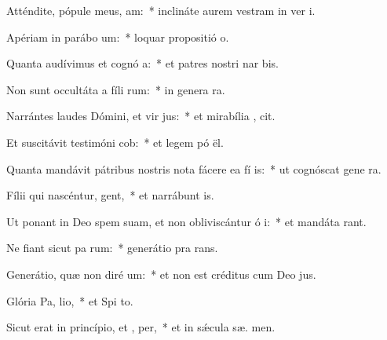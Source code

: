 \item Atténdite, pópule meus,  am:~* inclináte aurem vestram in ver  i.
\item Apériam in parábo  um:~* loquar propositió  o.
\item Quanta audívimus et cognó a:~* et patres nostri nar bis.
\item Non sunt occultáta a fíli rum:~* in genera ra.
\item Narrántes laudes Dómini, et vir jus:~* et mirabília ,  cit.
\item Et suscitávit testimóni  cob:~* et legem pó  ël.
\item Quanta mandávit pátribus nostris nota fácere ea fí is:~* ut cognóscat gene ra.
\item Fílii qui nascéntur,  gent,~* et narrábunt  is.
\item Ut ponant in Deo spem suam, et non obliviscántur ó i:~* et mandáta  rant.
\item Ne fiant sicut pa rum:~* generátio pra  rans.
\item Generátio, quæ non diré  um:~* et non est créditus cum Deo  jus.
\item Glória Pa,  lio,~* et Spi to.
\item Sicut erat in princípio, et ,  per,~* et in sǽcula sæ. men.

